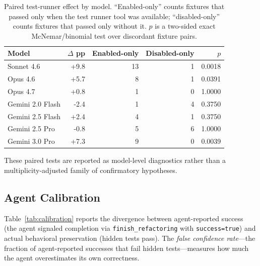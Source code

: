 \documentclass[11pt,letterpaper]{article}
\begin{document}
\begin{table}[ht]
\centering
\caption{Paired test-runner effect by model. ``Enabled-only'' counts fixtures that passed only when the test runner tool was available; ``disabled-only'' counts fixtures that passed only without it. $p$ is a two-sided exact McNemar/binomial test over discordant fixture pairs.}
\label{tab:paired-tool-effect}
\small
\begin{tabular}{lrrrr}
\toprule
\textbf{Model} & \textbf{$\Delta$ pp} & \textbf{Enabled-only} & \textbf{Disabled-only} & \textbf{$p$} \\
\midrule
Sonnet 4.6 & +9.8 & 13 & 1 & 0.0018 \\
Opus 4.6 & +5.7 & 8 & 1 & 0.0391 \\
Opus 4.7 & +0.8 & 1 & 0 & 1.0000 \\
Gemini 2.0 Flash & -2.4 & 1 & 4 & 0.3750 \\
Gemini 2.5 Flash & +2.4 & 4 & 1 & 0.3750 \\
Gemini 2.5 Pro & -0.8 & 5 & 6 & 1.0000 \\
Gemini 3.0 Pro & +7.3 & 9 & 0 & 0.0039 \\
\bottomrule
\end{tabular}
\end{table}

\noindent These paired tests are reported as model-level diagnostics rather than a multiplicity-adjusted family of confirmatory hypotheses.

\subsection{Agent Calibration}

Table~\ref{tab:calibration} reports the divergence between agent-reported success (the agent signaled completion via \texttt{finish\_refactoring} with \texttt{success=true}) and actual behavioral preservation (hidden tests pass). The \emph{false confidence rate}---the fraction of agent-reported successes that fail hidden tests---measures how much the agent overestimates its own correctness.
\end{document}
